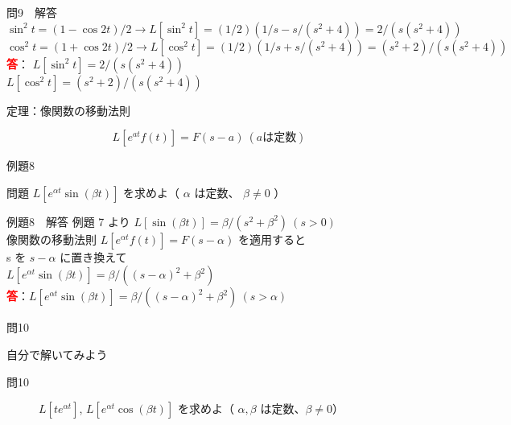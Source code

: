 \documentclass[professionalfonts]{beamer}
\begin{document}
\begin{frame}{問9　解答}
  $\sin^{2}t = (1-\cos 2t)/2   \to   L[\sin^{2}t] = (1/2)(1/s - s/(s^{2}+4)) = 2/(s(s^{2}+4))$\\[4pt]
  $\cos^{2}t = (1+\cos 2t)/2   \to   L[\cos^{2}t] = (1/2)(1/s + s/(s^{2}+4)) = (s^{2}+2)/(s(s^{2}+4))$
  \\[8pt]\textcolor{red}{\textbf{答}}：
  $L[\sin^{2}t] = 2/(s(s^{2}+4))$\\
  $L[\cos^{2}t] = (s^{2}+2)/(s(s^{2}+4))$\\
\end{frame}

\begin{frame}{定理：像関数の移動法則}
  \begin{block}{}
  \[
    L[e^{at}f(t)] = F(s-a) \ (a は定数)
  \]
  \end{block}
\end{frame}

\begin{frame}{例題8}
  \begin{exampleblock}{問題}
    $L[e^{\alpha t}\sin(\beta t)]$ を求めよ（ $\alpha$ は定数、 $\beta \neq 0$ ）\\[2pt]
  \end{exampleblock}
\end{frame}

\begin{frame}{例題8　解答}
  例題 7 より $L[\sin(\beta t)] = \beta/(s^{2}+\beta^{2}) \ (s > 0)$\\[4pt]
  像関数の移動法則 $L[e^{\alpha t}f(t)] = F(s-\alpha)$ を適用すると\\[4pt]
  s を $s-\alpha$ に置き換えて\\[4pt]
  $L[e^{\alpha t}\sin(\beta t)] = \beta/((s-\alpha)^{2}+\beta^{2})$
  \\[8pt]\textcolor{red}{\textbf{答}}：$L[e^{\alpha t}\sin(\beta t)] = \beta/((s-\alpha)^{2}+\beta^{2}) \ (s > \alpha)$
\end{frame}

\begin{frame}{問10}
  \begin{exampleblock}{自分で解いてみよう}
  \begin{description}
    \item[問10] $L[te^{\alpha t}]$, $L[e^{\alpha t}\cos(\beta t)]$ を求めよ（ $\alpha, \beta$ は定数、$\beta \neq 0$）
  \end{description}
  \end{exampleblock}
\end{frame}
\end{document}

